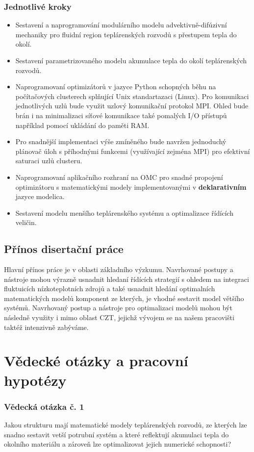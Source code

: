 \subsection*{Jednotlivé kroky}
\begin{itemize}
  \item
    Sestavení a naprogramování modulárního modelu advektivně-difúzivní
    mechaniky pro fluidní region teplárenských rozvodů s přestupem tepla do
    okolí.
  \item
    Sestavení parametrizovaného modelu akumulace tepla do okolí teplárenských
    rozvodů.
  \item
    Naprogramovaní optimizátorů v jazyce Python schopných běhu na počítačových
    clusterech splňující Unix standartazaci (Linux). Pro komunikaci
    jednotlivých uzlů bude využit uzlový komunikační protokol MPI. Ohled bude
    brán i na minimalizaci síťové komunikace také pomalých I/O přístupů
    například pomocí ukládání do paměti RAM.
  \item
    Pro snadnější implementaci výše zmíněného bude navržen jednoduchý plánovač
    úloh s příhodnými funkcemi (využívající zejména MPI) pro efektivní saturaci
    uzlů clusteru.
  \item
    Naprogramovaní aplikačního rozhraní na OMC pro snadné propojení
    optimizátoru s matematickými modely implementovanými v
    \textbf{deklarativním} jazyce modelica.
  \item
    Sestavení modelu menšího teplárenského systému a optimalizace řídících
    veličin.
\end{itemize}
\section{Přínos disertační práce}
\label{sec:prinos}
Hlavní přínos práce je v oblasti základního výzkumu. Navrhované postupy a
nástroje mohou výrazně usnadnit hledaní řídících strategií s ohledem na
integraci fluktuicích nízkoteplotních zdrojů a také usnadnit hledání
optimalních matematických modelů komponent ze kterých, je vhodné sestavit model
většího systémů. Navrhovaný postup a nástroje pro optimalizaci modelů mohou být
následně využity i mimo oblast CZT, jejichž vývojem se na našem pracovišti
taktéž intenzivně zabýváme.

\chapter{Vědecké otázky a pracovní hypotézy}
\label{chap:SciQaH}
\subsection*{Vědecká otázka č. 1}
Jakou strukturu mají matematické modely teplárenských rozvodů, ze kterých lze
snadno sestavit vetší potrubní systém a které reflektují akumulaci tepla do
okolního materiálu a zároveň lze optimalizovat jejich numerické schopnosti?
